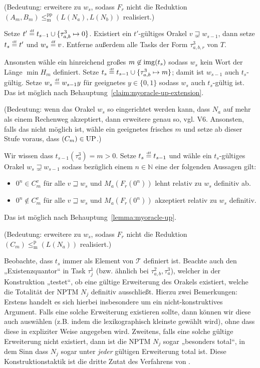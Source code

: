 \begin{description}[leftmargin=\parindent]
        (Bedeutung: erweitere zu $w_s$, sodass $F_r$ nicht die Reduktion $(A_m, B_m)\!\leq_\mathrm{m}^\mathrm{pp}\! (L(N_a), L(N_b))$ realisiert.) 

    \item[Task $\tau^3_{a}$:] Setze $t'\stackrel{\text{\smash{\tiny df}}}{=} t_{s-1}\cup\{\tau^3_{a,b}\mapsto 0\}$. Existiert ein $t'$-gültiges Orakel $v\sqsupsetneq w_{s-1}$, dann setze $t_s\stackrel{\text{\smash{\tiny df}}}{=} t'$ und $w_s\stackrel{\text{\smash{\tiny df}}}{=} v$. Entferne außerdem alle Tasks der Form $\tau^3_{a,b,r}$ von $T$.

        Ansonsten wähle ein hinreichend großes $m\not\in \operatorname{img}(t_s)$ sodass $w_s$ kein Wort der Länge $\min H_m$ definiert. Setze $t_s\stackrel{\text{\smash{\tiny df}}}{=} t_{s-1}\cup \{ \tau^3_{a,b}\mapsto m \}$; damit ist $w_{s-1}$ auch $t_s$-gültig. Setze $w_s\stackrel{\text{\smash{\tiny df}}}{=} w_{s-1}y$ für geeignetes $y\in\{0,1\}$ sodass $w_s$ auch $t_s$-gültig ist. Das ist möglich nach Behauptung~\ref{claim:myoracle-up-extension}.

        (Bedeutung: wenn das Orakel $w_s$ so eingerichtet werden kann, dass $N_a$ auf mehr als einem Rechenweg akzeptiert, dann erweitere genau so, vgl. V6. Ansonsten, falls das nicht möglich ist, wähle ein geeignetes frisches $m$ und setze ab dieser Stufe voraus, dass $(C_m)\in \mathrm{UP}$.) 

    \item[Task $\tau^3_{a,r}$:] Wir wissen dass $t_{s-1}(\tau^3_{a})=m>0$. Setze $t_s\stackrel{\text{\smash{\tiny df}}}{=} t_{s-1}$ und wähle ein $t_s$-gültiges Orakel $w_s\sqsupsetneq w_{s-1}$ sodass bezüglich einem $n\in\mathbb N$ eine der folgenden Aussagen gilt:
        \begin{itemize}[nosep,endpenalty=10000]
            \item $0^n\in C_m^v$ für alle $v\sqsupseteq w_s$ und $M_a(F_r(0^n))$ lehnt relativ zu $w_s$ definitiv ab.
            \item $0^n\not\in C_m^v$ für alle $v\sqsupseteq w_s$ und $M_a(F_r(0^n))$ akzeptiert relativ zu $w_s$ definitiv.
        \end{itemize} Das ist möglich nach Behauptung~\ref{lemma:myoracle-up}.

        (Bedeutung: erweitere zu $w_s$, sodass $F_r$ nicht die Reduktion $(C_m)\leq_\mathrm{m}^\mathrm{p} (L(N_a))$ realisiert.) 
\end{description}

Beobachte, dass $t_s$ immer als Element von $\mathcal T$ definiert ist.
Beachte auch den „Existenzquantor“ in Task $\tau^1_j$ (bzw. ähnlich bei $\tau^2_{a,b}, \tau^3_a$), welcher in der Konstruktion „testet“, ob eine gültige Erweiterung des Orakels existiert, welche die Totalität der NPTM $N_j$ definitiv ausschließt. 
Hierzu zwei Bemerkungen: Erstens handelt es sich hierbei insbesondere um ein nicht-konstruktives Argument. Falls eine solche Erweiterung existieren sollte, dann können wir diese auch auswählen (z.B. indem die lexikographisch kleinste gewählt wird), ohne dass diese in expliziter Weise angegeben wird.
Zweitens, falls eine solche gültige Erweiterung nicht existiert, dann ist die NPTM $N_j$ sogar „besonders total“, in dem Sinn dass $N_j$ sogar unter \emph{jeder} gültigen Erweiterung total ist. 
Diese Konstruktionstaktik ist die dritte Zutat des Verfahrens von \citeauthor{dose_np-completeness_2019}.

